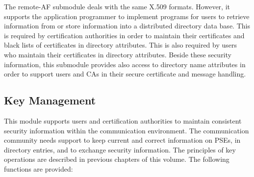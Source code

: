 The remote-AF submodule
deals with the same X.509 formats.
However, it supports the application programmer
to implement programs for users
to retrieve information
from or store information into a distributed directory data base.
This is required by certification authorities in order to maintain
their certificates and black lists of certificates in directory attributes.
This is also required by users who maintain their certificates in
directory attributes.
Beside these security information, this submodule provides also access to
directory name attributes in order to support users and CAs
in their secure certificate and message handling.

\subsection{Key Management}
\label{isw-km}

This module supports users and certification authorities
to maintain consistent security information
within the communication environment.
The communication community needs support
to keep current and correct
information on PSEs, in directory entries,
and to exchange security information.
The principles of key operations are described in previous chapters
of this volume.
The following functions are provided:

